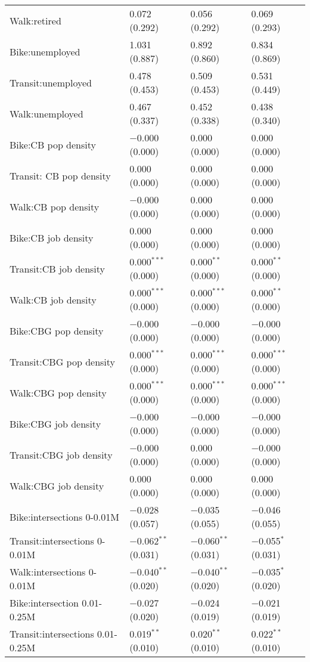 \begin{longtabu}{llll}
  Walk:retired & 0.072 (0.292) & 0.056 (0.292) & 0.069 (0.293) \\ 
  Bike:unemployed & 1.031 (0.887) & 0.892 (0.860) & 0.834 (0.869) \\ 
  Transit:unemployed & 0.478 (0.453) & 0.509 (0.453) & 0.531 (0.449) \\ 
  Walk:unemployed & 0.467 (0.337) & 0.452 (0.338) & 0.438 (0.340) \\ 
  Bike:CB pop density & $-$0.000 (0.000) & 0.000 (0.000) & 0.000 (0.000) \\ 
  Transit: CB pop density & 0.000 (0.000) & 0.000 (0.000) & 0.000 (0.000) \\ 
  Walk:CB pop density & $-$0.000 (0.000) & 0.000 (0.000) & 0.000 (0.000) \\ 
  Bike:CB job density & 0.000 (0.000) & 0.000 (0.000) & 0.000 (0.000) \\ 
  Transit:CB job density & 0.000$^{***}$ (0.000) & 0.000$^{**}$ (0.000) & 0.000$^{**}$ (0.000) \\ 
  Walk:CB job density & 0.000$^{***}$ (0.000) & 0.000$^{***}$ (0.000) & 0.000$^{**}$ (0.000) \\ 
  Bike:CBG pop density & $-$0.000 (0.000) & $-$0.000 (0.000) & $-$0.000 (0.000) \\ 
  Transit:CBG pop density & 0.000$^{***}$ (0.000) & 0.000$^{***}$ (0.000) & 0.000$^{***}$ (0.000) \\ 
  Walk:CBG pop density & 0.000$^{***}$ (0.000) & 0.000$^{***}$ (0.000) & 0.000$^{***}$ (0.000) \\ 
  Bike:CBG job density & $-$0.000 (0.000) & $-$0.000 (0.000) & $-$0.000 (0.000) \\ 
  Transit:CBG job density & $-$0.000 (0.000) & 0.000 (0.000) & $-$0.000 (0.000) \\ 
  Walk:CBG job density & 0.000 (0.000) & 0.000 (0.000) & 0.000 (0.000) \\ 
  Bike:intersections 0-0.01M & $-$0.028 (0.057) & $-$0.035 (0.055) & $-$0.046 (0.055) \\ 
  Transit:intersections 0-0.01M & $-$0.062$^{**}$ (0.031) & $-$0.060$^{**}$ (0.031) & $-$0.055$^{*}$ (0.031) \\ 
  Walk:intersections 0-0.01M & $-$0.040$^{**}$ (0.020) & $-$0.040$^{**}$ (0.020) & $-$0.035$^{*}$ (0.020) \\ 
  Bike:intersection 0.01-0.25M & $-$0.027 (0.020) & $-$0.024 (0.019) & $-$0.021 (0.019) \\ 
  Transit:intersections 0.01-0.25M & 0.019$^{**}$ (0.010) & 0.020$^{**}$ (0.010) & 0.022$^{**}$ (0.010) \\ 

\end{longtabu}
